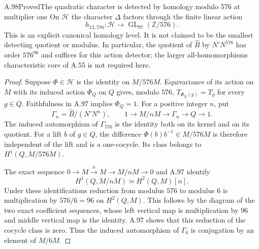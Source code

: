 \begin{statement}{A.98}{Proved}{The quadratic character is detected by homology modulo 576 at multiplier one}
On $\mathcal H$ the character $\Delta$ factors through the
finite linear action
\[
 h_{12,576}:\mathcal H\longrightarrow
        \operatorname{GL}_{97}(\mathbb Z/576).
 \tag{RH.2.1}
\]
This is an explicit canonical homology level. It is not claimed
to be the smallest detecting quotient or modulus.  In
particular, the quotient of $\widehat B$ by $N'N^{576}$ has
order $576^{98}$ and suffices for this action detector; the
larger all-homomorphisms characteristic core of A.55 is not
required here.
\end{statement}
\begin{proof}
Suppose $\Phi\in\mathcal H$ is the identity on $M/576M$.
Equivariance of its action on $M$ with its induced action
$\Phi_Q$ on $Q$ gives, modulo $576$,
$T_{\Phi_Q(g)}=T_g$ for every $g\in Q$.
Faithfulness in A.97 implies $\Phi_Q=1$.
For a positive integer $n$, put
\[
 \Gamma_n=\widehat B/(N'N^n),\qquad
 1\longrightarrow M/nM\longrightarrow\Gamma_n
       \longrightarrow Q\longrightarrow1.
\]
The induced automorphism of $\Gamma_{576}$ is the identity
both on its kernel and on its quotient. For a lift $b$ of
$g\in Q$, the difference $\Phi(b)b^{-1}\in M/576M$
is therefore independent of the lift and is a one-cocycle.
Its class belongs to $H^1(Q,M/576M)$.

The exact sequence $0\to M\xrightarrow{n}M\to M/nM\to0$
and A.97 identify
\[
 H^1(Q,M/nM)\simeq H^2(Q,M)[n].
\]
Under these identifications reduction from modulus $576$ to
modulus $6$ is multiplication by $576/6=96$ on $H^2(Q,M)$.
This follows by the diagram of the two exact coefficient
sequences, whose left vertical map is multiplication by $96$
and middle vertical map is the identity.  A.97 shows that this
reduction of the cocycle class is zero. Thus the induced
automorphism of $\Gamma_6$ is conjugation by an element of
$M/6M$.


\end{proof}
